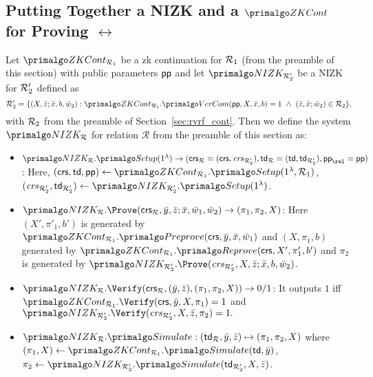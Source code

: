 
\subsection{Putting Together a NIZK and a $\ZKCont$  for Proving $\rel$} \label{sec:nizkR}

Let $\ZKCont_{\relone}$ be a zk continuation for $\mathcal{R}_1$ (from the preamble of this section)  with public parameters $ \mathsf{pp} $ and 
let $\nizktwo$ be a NIZK for $\mathcal{R}_2'$ defined as
$$\reltwo' = \{(X, \barz; \barx, b, \baromega_2): \ZKCont_{\relone}.\VerifyCom(\pp, X, \barx, b) =1\ 
\wedge \ (\barz, \barx; \baromega_2) \in \reltwo \},$$ 
with $\mathcal{R}_2$ from the preamble of Section~\ref{sec:rvrf_cont}. Then we define the system $\nizkR$ for relation $\mathcal{R}$ 
from the preamble of this section as:
\begin{itemize}
\item $\nizkR.\Setup(1^{\lambda})\rightarrow (\crsR = (\crs,\crstwo), \twR = (\tw, \twtwo), \pp_\rel = \pp)$: Here,
$(\crs, \tw, \pp) \leftarrow \ZKCont_{\relone}.\Setup(1^{\lambda}, \relone)$, $(\crstwo, \twtwo) \leftarrow \nizktwo.\Setup(1^{\lambda})$.


\item $\nizkR.\Prove(\crsR,\bary, \barz; \barx, \baromega_1, \baromega_2 ) \rightarrow (\pi_1, \pi_2, X)$: Here 
$(X', \pi'_1, b')$ is generated by $\ZKCont_{\relone}.\Preprove(\crs, \allowbreak \bar{y}, \allowbreak \bar{x}, \baromega_1)$ and 
$(X, \pi_1, b)$ generated by  $\ZKCont_{\relone}.\Reprove(\crs, X', \pi_1', b')$ and $ \pi_2 $ is generated by
$ \nizktwo.\Prove(\crstwo, \allowbreak X, \allowbreak \barz; \allowbreak \barx, b, \baromega_2)$. 

\item $\nizkR.\Verify(\crsR,(\bary, \barz), (\pi_1, \pi_2, X)) \rightarrow 0/1$: It outputs $1$ iff 
$\ZKCont_{\relone}.\Verify(\crs, \allowbreak \bar{y}, \allowbreak X, \pi_1) = 1 $ and $ \nizktwo.\Verify(\crstwo, X, \barz, \pi_2) =1.$

\item $\nizkR.\Sim: (\twR, \bary, \barz) \mapsto (\pi_1, \pi_2, X)$ where 
$(\pi_1, X) \leftarrow \ZKCont_{\relone}.\Sim(\tw, \bary)$, $\pi_2 \leftarrow \nizktwo.\Sim(\twtwo, X, \barz)$.
 \end{itemize}

